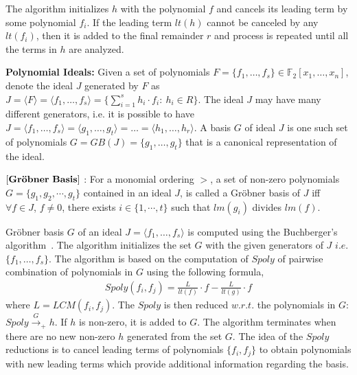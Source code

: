 The algorithm initializes $h$ with the polynomial $f$ and cancels its leading term by some 
polynomial $f_i$. If the leading term $lt(h)$ cannot be canceled by any $lt(f_i)$, then it is added to the 
final remainder $r$ and process is repeated until all the terms in $h$ are analyzed. 

{\bf Polynomial Ideals:} Given a set of polynomials $F = \{f_1, \dots, f_s\}\in \mathbb{F}_2[x_1,\dots, x_n]$, denote the ideal
$J$ generated by $F$ as $J = \langle F \rangle = \langle f_1, \dots, f_s \rangle =
\{\sum_{i=1}^{s} h_i\cdot f_i: ~h_i \in R\}.$ The ideal $J$ may have
many different generators, i.e. it is possible to have 
$J = \langle f_1, \dots, f_s\rangle = \langle g_1, \dots, g_t \rangle
= \dots = \langle h_1,\dots, h_r\rangle$. A \Grobner basis $G$ of ideal
$J$ is one such set of polynomials $G = GB(J) = \{g_1, \dots, g_t\}$
that is a canonical representation of the ideal. 

\begin{Definition}
\label{def:gb}
$\bf{\left[Gr\ddot{o}bner\ Basis\right]}$ \cite{gb_book}: 
For a monomial ordering $>$, a set  of non-zero polynomials $G =
\{g_1,g_2,\cdots,g_t\}$ contained in an ideal $J$, is called a
Gr\"{o}bner basis of $J$ iff 
$\forall f \in J$, $f\neq 0$, there exists $i \in \{1,\cdots, t\}$ such
that $lm(g_i)$ divides $lm(f)$.

\end{Definition}

\par Gr\"obner basis $G$ of an ideal $J = \langle f_1,\dots,f_s\rangle$ is computed using the Buchberger's algorithm~\cite{buchberger_thesis}. 
The algorithm initializes the set $G$ with the given generators of $J$ $i.e.$ $\{f_1,\dots,f_s\}$.
The algorithm is based on the computation of $Spoly$ of pairwise combination of polynomials 
in $G$ using the following formula,
\begin{equation}
\label{spoly}
\begin{split}
Spoly(f_i,f_j) = \frac{L}{lt(f)}\cdot f - \frac{L}{lt(g)}\cdot f
\end{split}
\end{equation}
where $L = LCM(f_i,f_j)$. The $Spoly$ is then reduced $w.r.t.$ the polynomials
 in $G$: $Spoly \stackrel{G} {\textstyle \longrightarrow}_+ h$. If $h$ is non-zero, it is added to $G$. The algorithm terminates when  
there are no new non-zero $h$ generated from the set $G$. The idea of the $Spoly$ reductions is to 
cancel leading terms of polynomials $\{f_i,f_j\}$ to obtain polynomials with new leading terms which 
provide additional information regarding the basis.

